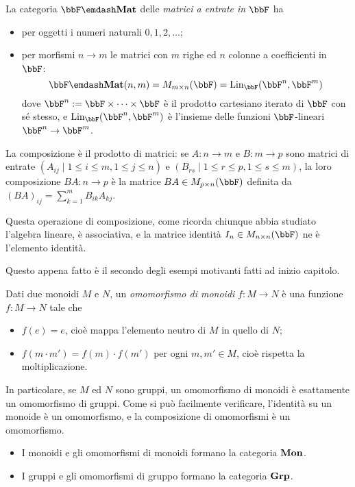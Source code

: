\begin{example}\label{ex_cat_matrici}
	La categoria \(\bbF\emdash\cate{Mat}\) delle \emph{matrici a entrate in \(\bbF\)} ha
	\begin{itemize}
		\item per oggetti i numeri naturali \(0,1,2,\dots\);
		\item per morfismi \(n\to m\) le matrici con \(m\) righe ed \(n\) colonne a coefficienti in \(\bbF\):
		      \[\bbF\emdash\cate{Mat}(n,m) = M_{m\times n}(\bbF) = \text{Lin}_{\bbF}(\bbF^n,\bbF^m)\]
		      dove \(\bbF^n:=\bbF \times\dots\times\bbF\) è il prodotto cartesiano iterato di \(\bbF\) con sé stesso, e \(\text{Lin}_{\bbF}(\bbF^n,\bbF^m)\) è l'insieme delle funzioni \(\bbF\)-lineari \(\bbF^n\to\bbF^m\).
	\end{itemize}
	La composizione è il prodotto di matrici: se \(A : n\to m\) e \(B : m\to p\) sono matrici di entrate \((A_{ij}\mid 1\le i\le m,1\le j\le n)\) e \((B_{rs}\mid 1\le r\le p,1\le s\le m)\), la loro composizione \(BA : n\to p\) è la matrice \(BA\in M_{p\times n}(\bbF)\) definita da \((BA)_{ij} = \sum_{k=1}^m B_{ik}A_{kj}\).

	Questa operazione di composizione, come ricorda chiunque abbia studiato l'algebra lineare, è associativa, e la matrice identità \(I_n\in M_{n\times n}(\bbF)\) ne è l'elemento identità.
\end{example}
Questo appena fatto è il secondo degli esempi motivanti fatti ad inizio capitolo.
\begin{example}\label{ex_cat_monoidi}
	Dati due monoidi \(M\) e \(N\), un \emph{omomorfismo di monoidi} \(f:M\to N\) è una funzione \(f:M\to N\) tale che
	\begin{itemize}
		\item \(f(e) = e\), cioè mappa l'elemento neutro di \(M\) in quello di \(N\);
		\item \(f(m\cdot m')=f(m)\cdot f(m')\) per ogni \(m,m'\in M\), cioè rispetta la moltiplicazione.
	\end{itemize}
	In particolare, se \(M\) ed \(N\) sono gruppi, un omomorfismo di monoidi è esattamente un omomorfismo di gruppi.
	Come si può facilmente verificare, l'identità su un monoide è un omomorfismo, e la composizione di omomorfismi è un omomorfismo.
	\begin{itemize}
		\item I monoidi e gli omomorfismi di monoidi formano la categoria \(\mathbf{Mon}\).
		\item I gruppi e gli omomorfismi di gruppo formano la categoria \(\mathbf{Grp}\).
	\end{itemize}
\end{example}

